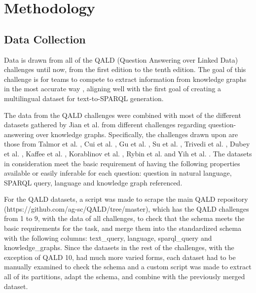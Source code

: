 \section{Methodology}\label{section::methodology}

\subsection{Data Collection}

Data is drawn from all of the QALD (Question Answering over Linked Data) challenges until now, from the first edition to the tenth edition. The goal of this challenge is for teams to compete to extract information from knowledge graphs in the most accurate way \cite{LOPEZ20133}, aligning well with the first goal of creating a multilingual dataset for text-to-SPARQL generation.

The data from the QALD challenges were combined with most of the different datasets gathered by Jian et al. \cite{jiang2022knowledge} from different challenges regarding question-answering over knowledge graphs. Specifically, the challenges drawn upon are those from Talmor et al. \cite{Talmor2018TheWA}, Cui et al. \cite{2021arXiv210803509C}, Gu et al. \cite{gu2021beyond}, Su et al. \cite{su-etal-2016-generating, s}, Trivedi et al. \cite{trivedi2017lc}, Dubey et al. \cite{dubey2017lc2}, Kaffee et al. \cite{DBLP:conf/kcap/KaffeeESV19}, Korablinov et al. \cite{2020arXiv200510659K}, Rybin et al. \cite{rybin2021rubq} and Yih et al. \cite{yih-etal-2016-value}. The datasets in consideration meet the basic requirement of having the following properties available or easily inferable for each question: question in natural language, SPARQL query, language and knowledge graph referenced.

For the QALD datasets, a script was made to scrape the main QALD repository (https://github.com/ag-sc/QALD/tree/master), which has the QALD challenges from 1 to 9, with the data of all challenges, to check that the schema meets the basic requirements for the task, and merge them into the standardized schema with the following columns: text\_query, language, sparql\_query and knowledge\_graphs. Since the datasets in the rest of the challenges, with the exception of QALD 10, had much more varied forms, each dataset had to be manually examined to check the schema and a custom script was made to extract all of its partitions, adapt the schema, and combine with the previously merged dataset.

